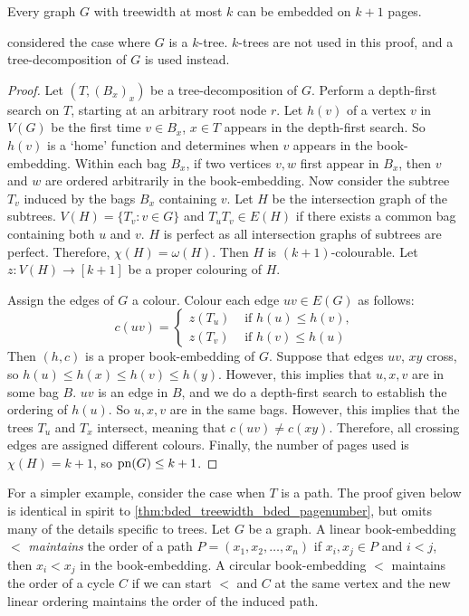 \begin{theorem}\label{thm:bded_treewidth_bded_pagenumber}
	Every graph \(G\) with treewidth at most $k$ can be embedded on $k + 1$ pages.
\end{theorem}
\textcite{ganleyPagenumberTrees2001} considered the case where \(G\) is a \(k\)-tree. $k$-trees are not used in this proof, and a tree-decomposition of \(G\) is used instead. 

\begin{proof}
	Let  $(T, (B_x)_x)$ be a tree-decomposition of \(G\). Perform a depth-first search on \(T\), starting at an arbitrary root node \(r\). Let \(h(v)\) of a vertex \(v\) in \(V(G)\) be the first time \(v \in B_x\), $x \in T$ appears in the depth-first search. So $h(v)$ is a `home' function and determines when $v$ appears in the book-embedding. Within each bag $B_x$, if two vertices $v,w$ first appear in $B_x$, then $v$ and $w$ are ordered arbitrarily in the book-embedding. Now consider the subtree \(T_v\) induced by the bags \(B_x\) containing \(v\). Let \(H\) be the intersection graph of the subtrees. \(V(H) = \lbrace T_v : v \in G \rbrace\) and \(T_u T_v \in E(H)\) if there exists a common bag containing both $u$ and $v$. \(H\) is perfect as all intersection graphs of subtrees are perfect. Therefore, \(\chi(H) = \omega(H)\). Then \(H\) is \((k + 1)\)-colourable. Let $z: V(H) \rightarrow [k + 1]$ be a proper colouring of $H$. 

	Assign the edges of \(G\) a colour. Colour each edge \(uv \in E(G)\) as follows:
	\begin{equation}
		c(uv) =
		\begin{cases}
			z(T_u) & \text{ if } h(u) \leq h(v), \\
			z(T_v) & \text{ if } h(v) \leq h(u)
		\end{cases}
	\end{equation}
	Then $(h, c)$ is a proper book-embedding of \(G\). Suppose that edges \(uv\), \(xy\) cross, so \(h(u) \leq h(x) \leq h(v) \leq h(y)\). However, this implies that $u,x,v$ are in some bag $B$. \(uv\) is an edge in \(B\), and we do a depth-first search to establish the ordering of $h(u)$. So \(u, x, v\) are in the same bags. However, this implies that the trees \(T_u\) and \(T_x\) intersect, meaning that \(c(uv) \neq c(xy)\). Therefore, all crossing edges are assigned different colours. Finally, the number of pages used is \(\chi(H) = k + 1\), so \(\operatorname{pn}(G) \leq k + 1\). 
\end{proof}
For a simpler example, consider the case when $T$ is a path. The proof given below is identical in spirit to \cref{thm:bded_treewidth_bded_pagenumber}, but omits many of the details specific to trees. 
Let $G$ be a graph. A linear book-embedding $<$ \textit{maintains} the order of a path $P = (x_1, x_2, \ldots, x_n)$ if $x_i, x_j \in P$ and $i < j$, then $x_i < x_j$ in the book-embedding. A circular book-embedding $<$ maintains the order of a cycle $C$ if we can start $<$ and $C$ at the same vertex and the new linear ordering maintains the order of the induced path. 

